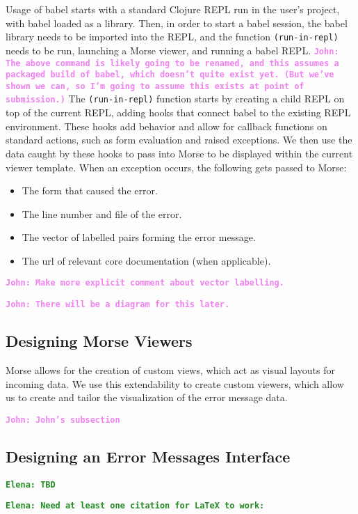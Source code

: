\documentclass[12pt]{article}
\newcommand{\comment}[1]{{\bf \tt  {#1}}}
\newcommand{\emcomment}[1]{\textcolor{ForestGreen}{\comment{Elena: {#1}}}}
\newcommand{\jwcomment}[1]{\textcolor{violet}{\comment{John: {#1}}}}
\begin{document}
Usage of babel starts with a standard Clojure REPL run in the user's project, with babel loaded as a library.
Then, in order to start a babel session, the babel library needs to be imported into the REPL, and the function 
\texttt{(run-in-repl)} needs to be run, launching a Morse viewer, and running a babel REPL.
\jwcomment{The above command is likely going to be renamed, and this assumes a packaged build of babel, which
doesn't quite exist yet. (But we've shown we can, so I'm going to assume this exists at point of submission.)}
The \texttt{(run-in-repl)} function starts by creating a child REPL on top of the current REPL, adding hooks that connect babel to 
the existing REPL environment. 
These hooks add behavior and allow for callback functions on standard actions, such as form evaluation and raised exceptions.
We then use the data caught by these hooks to pass into Morse to be displayed within the current viewer template. 
When an exception occurs, the following gets passed to Morse:
\begin{itemize}
	\item{The form that caused the error.}
	\item{The line number and file of the error.}
	\item{The vector of labelled pairs forming the error message.}
	\item{The url of relevant core documentation (when applicable).}
\end{itemize}

\jwcomment{Make more explicit comment about vector labelling.}

\jwcomment{There will be a diagram for this later.}

\subsection{Designing Morse Viewers}\label{subsec:Morse-Viewers}
Morse allows for the creation of custom views, which act as visual layouts for incoming data. 
We use this extendability to create custom viewers, which allow us to create and tailor the visualization of the error message data.


\jwcomment{John's subsection}

\subsection{Designing an Error Messages Interface}\label{subsec:interface}
\emcomment{TBD}


\emcomment{Need at least one citation for LaTeX to work:}
\cite{Hickey:2008}
\end{document}

